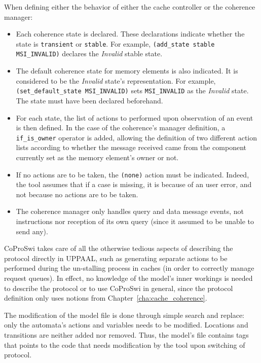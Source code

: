 When defining either the behavior of either the cache controller or the
coherence manager:
\begin{itemize}
\item
   Each coherence state is declared. These declarations indicate whether the
   state is \lstinline!transient! or \lstinline!stable!. For example,
   \lstinline!(add_state stable MSI_INVALID)! declares the \textit{Invalid}
   stable state.
\item
   The default coherence state for memory elements is also indicated. It is
   considered to be the \textit{Invalid} state's representation. For example,
   \lstinline!(set_default_state MSI_INVALID)! sets \lstinline!MSI_INVALID!  as
   the \textit{Invalid} state. The state must have been declared beforehand.
\item
   For each state, the list of actions to performed upon observation of an
   event is then defined. In the case of the coherence's manager definition,
   a \lstinline!if_is_owner! operator is added, allowing the definition of two
   different action lists according to whether the message received came from
   the component currently set as the memory element's owner or not.
\item
   If no actions are to be taken, the \lstinline!(none)! action must be
   indicated. Indeed, the tool assumes that if a case is missing, it is because
   of an user error, and not because no actions are to be taken.
\item
   The coherence manager only handles query and data message events, not
   instructions nor reception of its own query (since it assumed to be unable
   to send any).
\end{itemize}

CoProSwi takes care of all the otherwise tedious aspects of describing the
protocol directly in UPPAAL, such as generating separate actions to be
performed during the un-stalling process in caches (in order to correctly
manage request queues). In effect, no knowledge of the model's
inner workings is needed to describe the protocol or to use CoProSwi in
general, since the protocol definition only uses notions from
Chapter~\ref{cha:cache_coherence}.

The modification of the model file is done through simple search and replace:
only the automata's actions and variables needs to be modified. Locations and
transitions are neither added nor removed. Thus, the model's file contains tags
that points to the code that needs modification by the tool upon switching of
protocol.

